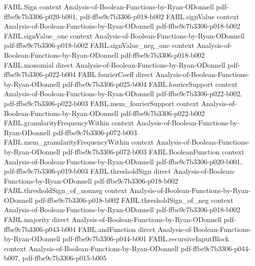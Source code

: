 \begin{theorem}
\label{FABL.andFunction_not_odd}
\leanok
{}
\proofstep
  {FABL.Sign}
  {context}
  {Analysis-of-Boolean-Functions-by-Ryan-ODonnell}
  {pdf-ffbe9c7b3306-p020-b001,
    pdf-ffbe9c7b3306-p018-b002}
\proofstep
  {FABL.signValue}
  {context}
  {Analysis-of-Boolean-Functions-by-Ryan-ODonnell}
  {pdf-ffbe9c7b3306-p018-b002}
\proofstep
  {FABL.signValue_one}
  {context}
  {Analysis-of-Boolean-Functions-by-Ryan-ODonnell}
  {pdf-ffbe9c7b3306-p018-b002}
\proofstep
  {FABL.signValue_neg_one}
  {context}
  {Analysis-of-Boolean-Functions-by-Ryan-ODonnell}
  {pdf-ffbe9c7b3306-p018-b002}
\proofstep
  {FABL.monomial}
  {direct}
  {Analysis-of-Boolean-Functions-by-Ryan-ODonnell}
  {pdf-ffbe9c7b3306-p022-b004}
\proofstep
  {FABL.fourierCoeff}
  {direct}
  {Analysis-of-Boolean-Functions-by-Ryan-ODonnell}
  {pdf-ffbe9c7b3306-p025-b004}
\proofstep
  {FABL.fourierSupport}
  {context}
  {Analysis-of-Boolean-Functions-by-Ryan-ODonnell}
  {pdf-ffbe9c7b3306-p022-b002,
    pdf-ffbe9c7b3306-p022-b003}
\proofstep
  {FABL.mem_fourierSupport}
  {context}
  {Analysis-of-Boolean-Functions-by-Ryan-ODonnell}
  {pdf-ffbe9c7b3306-p022-b002}
\proofstep
  {FABL.granularityFrequencyWithin}
  {context}
  {Analysis-of-Boolean-Functions-by-Ryan-ODonnell}
  {pdf-ffbe9c7b3306-p072-b003}
\proofstep
  {FABL.mem_granularityFrequencyWithin}
  {context}
  {Analysis-of-Boolean-Functions-by-Ryan-ODonnell}
  {pdf-ffbe9c7b3306-p072-b003}
\proofstep
  {FABL.BooleanFunction}
  {context}
  {Analysis-of-Boolean-Functions-by-Ryan-ODonnell}
  {pdf-ffbe9c7b3306-p020-b001,
    pdf-ffbe9c7b3306-p019-b003}
\proofstep
  {FABL.thresholdSign}
  {direct}
  {Analysis-of-Boolean-Functions-by-Ryan-ODonnell}
  {pdf-ffbe9c7b3306-p018-b002}
\proofstep
  {FABL.thresholdSign_of_nonneg}
  {context}
  {Analysis-of-Boolean-Functions-by-Ryan-ODonnell}
  {pdf-ffbe9c7b3306-p018-b002}
\proofstep
  {FABL.thresholdSign_of_neg}
  {context}
  {Analysis-of-Boolean-Functions-by-Ryan-ODonnell}
  {pdf-ffbe9c7b3306-p018-b002}
\proofstep
  {FABL.majority}
  {direct}
  {Analysis-of-Boolean-Functions-by-Ryan-ODonnell}
  {pdf-ffbe9c7b3306-p043-b004}
\proofstep
  {FABL.andFunction}
  {direct}
  {Analysis-of-Boolean-Functions-by-Ryan-ODonnell}
  {pdf-ffbe9c7b3306-p044-b001}
\proofstep
  {FABL.recursiveInputBlock}
  {context}
  {Analysis-of-Boolean-Functions-by-Ryan-ODonnell}
  {pdf-ffbe9c7b3306-p044-b007,
    pdf-ffbe9c7b3306-p015-b005}

\end{theorem}
